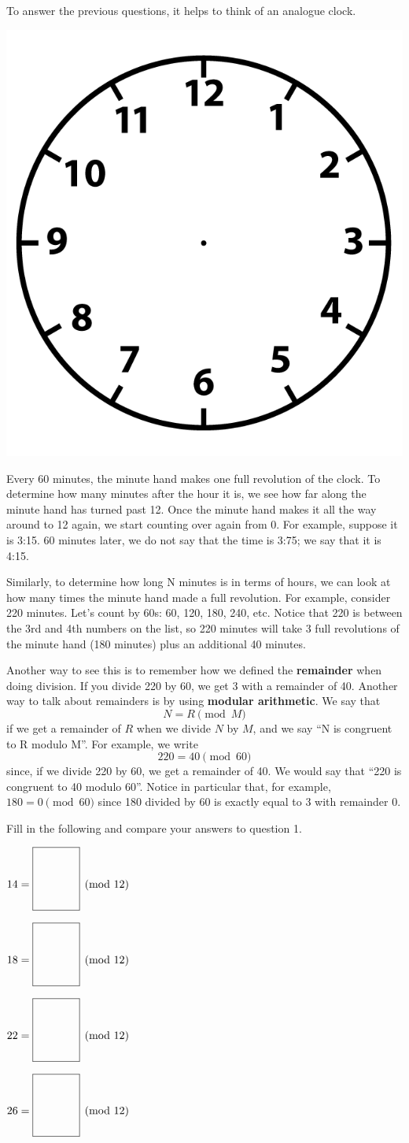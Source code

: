 \documentclass[12pt,noauthor,nooutcomes, instructornotes]{ximera}
\begin{document}
To answer the previous questions, it helps to think of an analogue clock.

\centerline{\includegraphics[width=.3\textwidth]{modularArithmetic/Clock.png}}

Every 60 minutes, the minute hand makes one full revolution of the clock. To determine how many minutes after the hour it is, we see how far along the minute hand has turned past 12. Once the minute hand makes it all the way around to 12 again, we start counting over again from 0. For example, suppose it is 3:15. 60 minutes later, we do not say that the time is 3:75; we say that it is 4:15.

Similarly, to determine how long N minutes is in terms of hours, we can look at how many times the minute hand made a full revolution. For example, consider 220 minutes. Let's count by 60s: 60, 120, 180, 240, etc. Notice that 220 is between the 3rd and 4th numbers on the list, so 220 minutes will take 3 full revolutions of the minute hand (180 minutes) plus an additional 40 minutes.

Another way to see this is to remember how we defined the \textbf{remainder} when doing division. If you divide 220 by 60, we get 3 with a remainder of 40. Another way to talk about remainders is by using \textbf{modular arithmetic}. We say that 
$$
N = R \pmod{M}
$$
if we get a remainder of $R$ when we divide $N$ by $M$,
and we say ``N is congruent to R modulo M''.
For example, we write
$$
220 = 40 \pmod{60}
$$
since, if we divide 220 by 60, we get a remainder of 40. We would say that ``220 is congruent to 40 modulo 60''. Notice in particular that, for example, $180 = 0 \pmod{60}$ since 180 divided by 60 is exactly equal to 3 with remainder 0.

\begin{question}
Fill in the following and compare your answers to question 1.
\begin{enumerate}
\begin{multicols}{2}
    
    \item $14 = \smallanswerbox \pmod{12}$
    \item $18 = \smallanswerbox \pmod{12}$
    \item $22 = \smallanswerbox \pmod{12}$
    \item $26 = \smallanswerbox \pmod{12}$
\end{multicols}
\end{enumerate}
\end{question}
\end{document}
